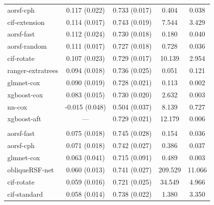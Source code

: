 \documentclass[12pt]{article}\usepackage[]{graphicx}\usepackage[]{xcolor}
\newenvironment{knitrout}{}{} %
\begin{document}
\begin{knitrout}
\begin{longtable}[t]{lcccc}
\hspace{1em}aorsf-cph & 0.117 (0.022) & 0.733 (0.017) & 0.404 & 0.038\\
\hspace{1em}cif-extension & 0.114 (0.017) & 0.743 (0.019) & 7.544 & 3.429\\
\hspace{1em}aorsf-fast & 0.112 (0.024) & 0.730 (0.018) & 0.180 & 0.040\\
\hspace{1em}aorsf-random & 0.111 (0.017) & 0.727 (0.018) & 0.728 & 0.036\\
\hspace{1em}cif-rotate & 0.107 (0.023) & 0.729 (0.017) & 10.139 & 2.954\\
\hspace{1em}ranger-extratrees & 0.094 (0.018) & 0.736 (0.025) & 0.051 & 0.121\\
\hspace{1em}glmnet-cox & 0.090 (0.019) & 0.728 (0.021) & 0.113 & 0.002\\
\hspace{1em}xgboost-cox & 0.083 (0.015) & 0.730 (0.020) & 2.632 & 0.003\\
\hspace{1em}nn-cox & -0.015 (0.048) & 0.504 (0.037) & 8.139 & 0.727\\
\hspace{1em}xgboost-aft & --- & 0.729 (0.021) & 12.179 & 0.006\\
\addlinespace[0.3em]
\multicolumn{5}{l}{\textit{\textbf{GUIDE-IT; CVD death, n = 894, p = 59}}}\\
\hline
\hspace{1em}aorsf-fast & 0.075 (0.018) & 0.745 (0.028) & 0.154 & 0.036\\
\hspace{1em}aorsf-cph & 0.071 (0.018) & 0.742 (0.027) & 0.386 & 0.037\\
\hspace{1em}glmnet-cox & 0.063 (0.041) & 0.715 (0.091) & 0.489 & 0.003\\
\hspace{1em}obliqueRSF-net & 0.060 (0.013) & 0.741 (0.027) & 209.529 & 11.066\\
\hspace{1em}cif-rotate & 0.059 (0.016) & 0.721 (0.025) & 34.549 & 4.966\\
\hspace{1em}cif-standard & 0.058 (0.014) & 0.738 (0.022) & 1.380 & 3.350\\

\end{longtable}
\end{knitrout}
\end{document}
